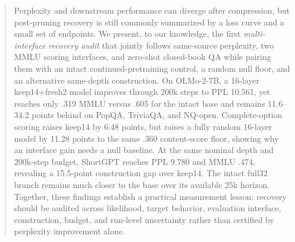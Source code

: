 \begin{abstract}
Perplexity and downstream performance can diverge after compression, but
post-pruning recovery is still commonly summarized by a loss curve and a small
set of endpoints. We present, to our knowledge, the first \emph{multi-interface
recovery audit} that jointly follows same-source perplexity, two MMLU scoring
interfaces, and zero-shot closed-book QA while pairing them with an intact
continued-pretraining control, a random null floor, and an alternative
same-depth construction. On OLMo-2-7B, a 16-layer keep14+fresh2 model improves
through 200k steps to PPL 10.561, yet reaches only .319 MMLU versus .605 for the
intact base and remains 11.6--34.2 points behind on PopQA, TriviaQA, and
NQ-open. Complete-option scoring raises keep14 by 6.48 points, but raises a
fully random 16-layer model by 11.28 points to the same .360 content-score
floor, showing why an interface gain needs a null baseline. At the same nominal
depth and 200k-step budget, ShortGPT reaches PPL 9.780 and MMLU .474, revealing
a 15.5-point construction gap over keep14. The intact full32 branch remains much
closer to the base over its available 25k horizon. Together, these findings
establish a practical measurement lesson: recovery should be audited across
likelihood, target behavior, evaluation interface, construction, budget, and
run-level uncertainty rather than certified by perplexity improvement alone.
\end{abstract}
